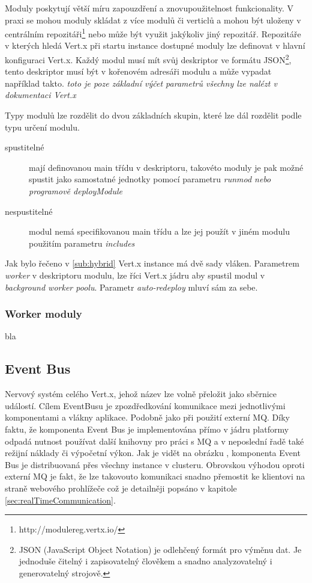 Moduly poskytují větší míru zapouzdření a znovupoužitelnost funkcionality. V praxi se mohou moduly skládat z více modulů či verticlů a mohou být uloženy v centrálním repozitáři\footnote{http://modulereg.vertx.io/} nebo může být využit jakýkoliv jiný repozitář. Repozitáře v kterých hledá Vert.x při startu instance dostupné moduly lze definovat v hlavní konfiguraci Vert.x.
Každý modul musí mít svůj deskriptor ve formátu JSON\footnote{JSON (JavaScript Object Notation) je odlehčený formát pro výměnu dat. Je jednoduše čitelný i zapisovatelný člověkem a snadno analyzovatelný i generovatelný strojově.}, tento deskriptor musí být v kořenovém adresáři modulu a může vypadat například takto. \emph{toto je poze základní výčet parametrů všechny lze nalézt v dokumentaci Vert.x}

Typy modulů lze rozdělit do dvou základních skupin, které lze dál rozdělit podle typu určení modulu. 

\begin{description}
\item[spustitelné]{mají definovanou main třídu v deskriptoru, takovéto moduly je pak možné spustit jako samostatné jednotky pomocí parametru \emph{runmod nebo programově deployModule} }
\item[nespustitelné]{modul nemá specifikovanou main třídu a lze jej použít v jiném modulu použitím parametru \emph{includes}}
\end{description}

Jak bylo řečeno v \ref{sub:hybrid} Vert.x instance má dvě sady vláken. Parametrem \emph{worker} v deskriptoru modulu, lze říci Vert.x jádru aby spustil modul v \emph{background worker poolu}. Parametr \emph{auto-redeploy} mluví sám za sebe.

\subsubsection{Worker moduly}

bla

\subsection{Event Bus}\label{sub:eventBus}

Nervový systém celého Vert.x, jehož název lze volně přeložit jako sběrnice událostí. Cílem EventBusu je zpozdředkování komunikace mezi jednotlivými komponentami a vlákny aplikace. Podobně jako při použití externí MQ. Díky faktu, že komponenta Event Bus je implementována přímo v jádru platformy odpadá nutnost používat další knihovny pro práci s MQ a v neposlední řadě také režijní náklady či výpočetní výkon. Jak je vidět na obrázku , komponenta Event Bus je distribuovaná přes všechny instance v clusteru. Obrovskou výhodou oproti externí MQ je fakt, že lze takovouto komunikaci snadno přemostit ke klientovi na straně webového prohlížeče což je detailněji popsáno v kapitole \ref{sec:realTimeCommunication}.

